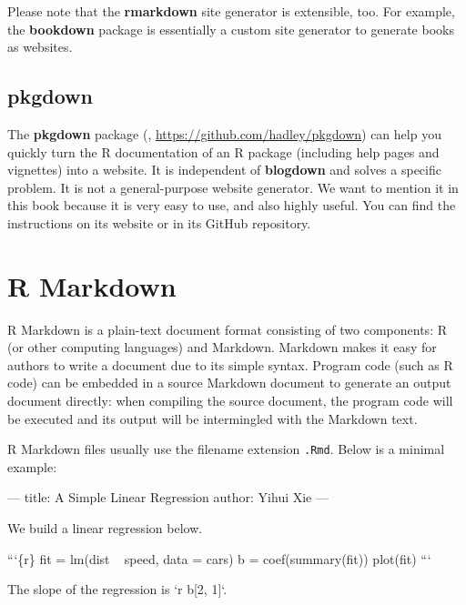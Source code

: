 \documentclass[12pt,]{krantz}
\makeatletter
\newenvironment{Shaded}{\begin{snugshade}}{\end{snugshade}}
\newcommand{\BaseNTok}[1]{\textcolor[rgb]{0.00,0.00,0.81}{#1}}
\newcommand{\NormalTok}[1]{#1}
\newenvironment{kframe}{%
\medskip{}
\setlength{\fboxsep}{.8em}
 \def\at@end@of@kframe{}%
 \ifinner\ifhmode%
  \def\at@end@of@kframe{\end{minipage}}%
  \begin{minipage}{\columnwidth}%
 \fi\fi%
 \def\FrameCommand##1{\hskip\@totalleftmargin \hskip-\fboxsep
 \colorbox{shadecolor}{##1}\hskip-\fboxsep
     \hskip-\linewidth \hskip-\@totalleftmargin \hskip\columnwidth}%
 \MakeFramed {\advance\hsize-\width
   \@totalleftmargin\z@ \linewidth\hsize
   \@setminipage}}%
 {\par\unskip\endMakeFramed%
 \at@end@of@kframe}
\renewenvironment{Shaded}{\begin{kframe}}{\end{kframe}}
\theoremstyle{definition}
\theoremstyle{definition}
\theoremstyle{definition}
\theoremstyle{remark}
\makeatother
\begin{document}
Please note that the \textbf{rmarkdown} site generator is extensible,
too. For example, the \textbf{bookdown} package \citep{R-bookdown} is
essentially a custom site generator to generate books as websites.

\hypertarget{pkgdown}{%
\section{pkgdown}\label{pkgdown}}

The \textbf{pkgdown} package (\citet{R-pkgdown},
\url{https://github.com/hadley/pkgdown}) can help you quickly turn the R
documentation of an R package (including help pages and vignettes) into
a website. It is independent of \textbf{blogdown} and solves a specific
problem. It is not a general-purpose website generator. We want to
mention it in this book because it is very easy to use, and also highly
useful. You can find the instructions on its website or in its GitHub
repository.

\cleardoublepage

\hypertarget{appendix-appendix}{%
\appendix {}}


\hypertarget{r-markdown}{%
\chapter{R Markdown}\label{r-markdown}}

R Markdown \citep{R-rmarkdown} is a plain-text
document format consisting of two components: R (or other computing
languages) and Markdown. Markdown makes it easy for authors to write a
document due to its simple syntax. Program code (such as R code) can be
embedded in a source Markdown document to generate an output document
directly: when compiling the source document, the program code will be
executed and its output will be intermingled with the Markdown text.

R Markdown files usually use the filename extension \texttt{.Rmd}. Below
is a minimal example:

\begin{Shaded}
\begin{Highlighting}[]
\NormalTok{---}
\NormalTok{title: A Simple Linear Regression}
\NormalTok{author: Yihui Xie}
\NormalTok{---}

\NormalTok{We build a linear regression below.}

\NormalTok{```\{r\}}
\NormalTok{fit = lm(dist ~ speed, data = cars)}
\NormalTok{b = coef(summary(fit))}
\NormalTok{plot(fit)}
\NormalTok{```}

\NormalTok{The slope of the regression is }\BaseNTok{`r b[2, 1]`}\NormalTok{.}
\end{Highlighting}
\end{Shaded}
\end{document}
